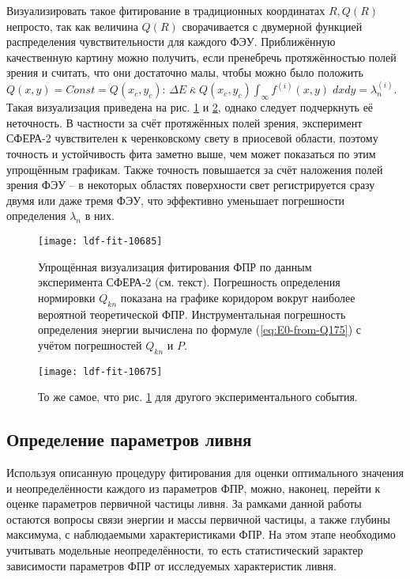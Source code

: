 Визуализировать такое фитирование в традиционных координатах $R, Q(R)$ непросто, так как величина $Q(R)$ сворачивается с двумерной функцией распределения чувствительности для каждого ФЭУ. Приближённую качественную картину можно получить, если пренебречь протяжённостью полей зрения и считать, что они достаточно малы, чтобы можно было положить $Q(x, y) = Const = Q(x_c, y_c)$: $\Delta E \; \bar{\kappa} \; Q(x_c, y_c) \int_{\infty} f^{(i)}(x, y) \; dx dy = \lambda_n^{(i)}$. Такая визуализация приведена на рис. \ref{pic:ldf-fit-example-1} и \ref{pic:ldf-fit-example-2}, однако следует подчеркнуть её неточность. В частности за счёт протяжённых полей зрения, эксперимент СФЕРА-2 чувствителен к черенковскому свету в приосевой области, поэтому точность и устойчивость фита заметно выше, чем может показаться по этим упрощённым графикам. Также точность повышается за счёт наложения полей зрения ФЭУ -- в некоторых областях поверхности свет регистрируется сразу двумя или даже тремя ФЭУ, что эффективно уменьшает погрешности определения $\lambda_n$ в них.


\begin{figure}
	\centering
	\texttt{[image: ldf-fit-10685]}
	\caption{Упрощённая визуализация фитирования ФПР по данным эксперимента СФЕРА-2 (см. текст). Погрешность определения нормировки $Q_{kn}$ показана на графике коридором вокруг наиболее вероятной теоретической ФПР. Инструментальная погрешность определения энергии вычислена по формуле (\ref{eq:E0-from-Q175}) с учётом погрешностей $Q_{kn}$ и $P$.}
	\label{pic:ldf-fit-example-1}
\end{figure}

\begin{figure}
	\centering
	\texttt{[image: ldf-fit-10675]}
	\caption{То же самое, что рис. \ref{pic:ldf-fit-example-1} для другого экспериментального события.}
	\label{pic:ldf-fit-example-2}
\end{figure}


\subsection{Определение параметров ливня}

Используя описанную процедуру фитирования для оценки оптимального значения и неопределённости каждого из параметров ФПР, можно, наконец, перейти к оценке параметров первичной частицы ливня. За рамками данной работы остаются вопросы связи энергии и массы первичной частицы, а также глубины максимума, с наблюдаемыми характеристиками ФПР. На этом этапе необходимо учитывать модельные неопределённости, то есть статистический зарактер зависимости параметров ФПР от исследуемых характеристик ливня.

